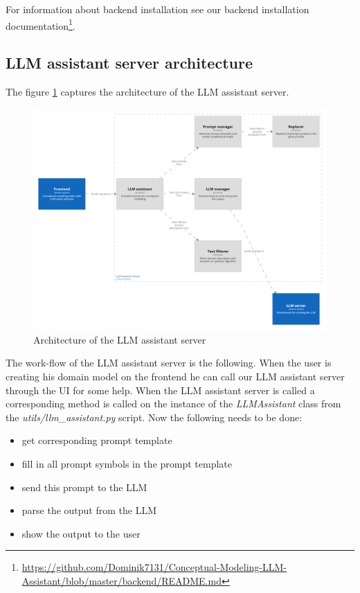 For information about backend installation see our backend installation documentation\footnote{\url{https://github.com/Dominik7131/Conceptual-Modeling-LLM-Assistant/blob/master/backend/README.md}}.


\subsection{LLM assistant server architecture}

The figure \ref{fig:llm_assistant_server_containers} captures the architecture of the LLM assistant server.

\begin{figure}[!h]
    \includegraphics[scale=0.14]{../docs/images/architecture/llm-assistant-server-containers.png}
    \caption{\centering Architecture of the LLM assistant server}
    \label{fig:llm_assistant_server_containers}
\end{figure}

The work-flow of the LLM assistant server is the following. When the user is creating his domain model on the frontend he can call our LLM assistant server through the UI for some help. When the LLM assistant server is called a corresponding method is called on the instance of the \textit{LLMAssistant} class from the \textit{utils/llm\_assistant.py} script. Now the following needs to be done:

\begin{itemize}
\item get corresponding prompt template
\item fill in all prompt symbols in the prompt template
\item send this prompt to the LLM
\item parse the output from the LLM
\item show the output to the user
\end{itemize}

